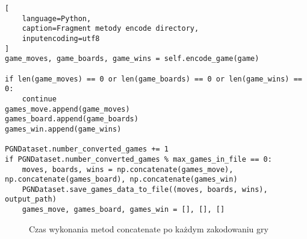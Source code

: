 \lstset{style=codeListingStyle}
\begin{lstlisting}[
    language=Python, 
    caption=Fragment metody encode directory,
    inputencoding=utf8
]
game_moves, game_boards, game_wins = self.encode_game(game)

if len(game_moves) == 0 or len(game_boards) == 0 or len(game_wins) == 0:
    continue
games_move.append(game_moves)
games_board.append(game_boards)
games_win.append(game_wins)

PGNDataset.number_converted_games += 1
if PGNDataset.number_converted_games % max_games_in_file == 0:
    moves, boards, wins = np.concatenate(games_move), np.concatenate(games_board), np.concatenate(games_win)
    PGNDataset.save_games_data_to_file((moves, boards, wins), output_path)
    games_move, games_board, games_win = [], [], []
\end{lstlisting}

\begin{figure}[!t]
    \centering
    \caption{Czas wykonania metod concatenate po każdym zakodowaniu gry}
    \label{fig:concatenate_time}
\end{figure}